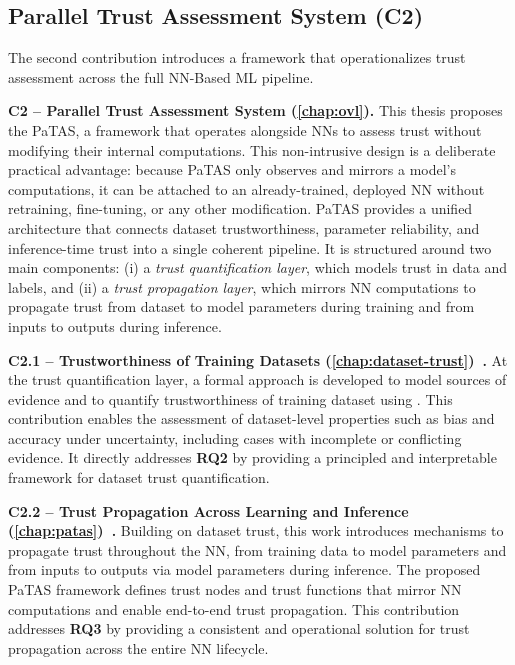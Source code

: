 \subsection{Parallel Trust Assessment System (C2)}

The second contribution introduces a framework that operationalizes trust assessment across the full \ac{NN}-Based \ac{ML} pipeline.

\textbf{C2 -- Parallel Trust Assessment System (\cref{chap:ovl}).}  
This thesis proposes the \acf{PaTAS}, a framework that operates alongside \acp{NN} to assess trust without modifying their internal computations. This non-intrusive design is a deliberate practical advantage: because \ac{PaTAS} only observes and mirrors a model's computations, it can be attached to an already-trained, deployed \ac{NN} without retraining, fine-tuning, or any other modification. \ac{PaTAS} provides a unified architecture that connects dataset trustworthiness, parameter reliability, and inference-time trust into a single coherent pipeline. It is structured around two main components: (i) a \emph{trust quantification layer}, which models trust in data and labels, and (ii) a \emph{trust propagation layer}, which mirrors \ac{NN} computations to propagate trust from dataset to model parameters during training and from inputs to outputs during inference.

\textbf{C2.1 -- Trustworthiness of Training Datasets (\cref{chap:dataset-trust})~\cite{10.1007/978-3-032-19096-3_17,trust-aidatatrust}.}  
At the trust quantification layer, a formal approach is developed to model sources of evidence and to quantify trustworthiness of training dataset using . 
This contribution enables the assessment of dataset-level properties such as bias and accuracy under uncertainty, including cases with incomplete or conflicting evidence. It directly addresses \textbf{\ac{RQ}2} by providing a principled and interpretable framework for dataset trust quantification.

\textbf{C2.2 -- Trust Propagation Across Learning and Inference (\cref{chap:patas})~\cite{patas}.}  
Building on dataset trust, this work introduces mechanisms to propagate trust throughout the \ac{NN}, from training data to model parameters and from inputs to outputs via model parameters during inference. The proposed \ac{PaTAS} framework defines trust nodes and trust functions that mirror \ac{NN} computations and enable end-to-end trust propagation. This contribution addresses \textbf{\ac{RQ}3} by providing a consistent and operational solution for trust propagation across the entire \ac{NN} lifecycle.

